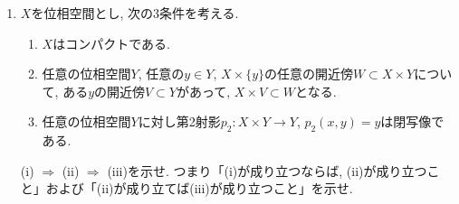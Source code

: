 \documentclass[dvipdfmx,a4paper,11pt]{article}
\newcommand{\R}{\mathbb{R}}
\theoremstyle{definition}
\begin{document}
\begin{enumerate}[label=\textbf{問}\ref*{sec-compact}.\arabic*]



\item \label{compact_equi} $X$を位相空間とし, 次の3条件を考える. 
\begin{enumerate}[label=(\roman*)]
 \setlength{\parskip}{0cm}
  \setlength{\itemsep}{0pt} 
\item  $X$はコンパクトである.
\item 任意の位相空間$Y$, 任意の$y \in Y$, $X \times \{ y\}$の任意の開近傍$W \subset X \times Y$について, ある$y$の開近傍$V \subset Y$があって, $X \times V \subset W$となる.
\item 任意の位相空間$Y$に対し第2射影$p_{2} : X \times Y \rightarrow Y$, $p_2(x,y)=y$は閉写像である. 
\end{enumerate}
(i) $\Rightarrow$ (ii) $\Rightarrow$ (iii)を示せ. つまり「(i)が成り立つならば, (ii)が成り立つこと」および「(ii)が成り立てば(iii)が成り立つこと」を示せ. 


\end{enumerate}
\end{document}
